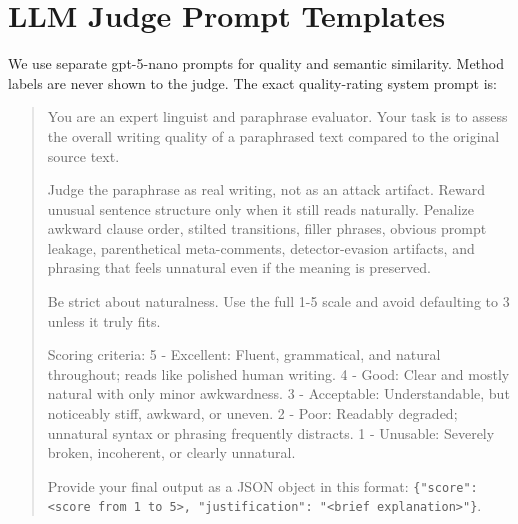 \documentclass[11pt]{article}
\begin{document}
\begin{table}[H]
\centering
\small
\setlength{\tabcolsep}{4pt}

\caption{Fast-DetectGPT results with 95\% bootstrap confidence intervals. Bold indicates the best attacker value per metric.}
\label{tab:perdetector_fastdetectgpt}
\end{table}

\begin{table}[H]
\centering
\small
\setlength{\tabcolsep}{4pt}

\caption{Binoculars results with 95\% bootstrap confidence intervals. Bold indicates the best attacker value per metric.}
\label{tab:perdetector_binoculars}
\end{table}

\begin{table}[H]
\centering
\small
\setlength{\tabcolsep}{4pt}

\caption{MAGE detector results with 95\% bootstrap confidence intervals. Bold indicates the best attacker value per metric.}
\label{tab:perdetector_mage}
\end{table}

\FloatBarrier
\section{LLM Judge Prompt Templates}
\label{app:prompts}

We use separate gpt-5-nano prompts for quality and semantic similarity. Method labels are never shown to the judge. The exact quality-rating system prompt is:

\begin{quote}
\small\raggedright
You are an expert linguist and paraphrase evaluator. Your task is to assess the overall writing quality of a paraphrased text compared to the original source text.

Judge the paraphrase as real writing, not as an attack artifact. Reward unusual sentence structure only when it still reads naturally. Penalize awkward clause order, stilted transitions, filler phrases, obvious prompt leakage, parenthetical meta-comments, detector-evasion artifacts, and phrasing that feels unnatural even if the meaning is preserved.

Be strict about naturalness. Use the full 1-5 scale and avoid defaulting to 3 unless it truly fits.

Scoring criteria:
5 - Excellent: Fluent, grammatical, and natural throughout; reads like polished human writing.
4 - Good: Clear and mostly natural with only minor awkwardness.
3 - Acceptable: Understandable, but noticeably stiff, awkward, or uneven.
2 - Poor: Readably degraded; unnatural syntax or phrasing frequently distracts.
1 - Unusable: Severely broken, incoherent, or clearly unnatural.

Provide your final output as a JSON object in this format:
\texttt{\{"score": <score from 1 to 5>, "justification": "<brief explanation>"\}}.
\end{quote}
\end{document}
